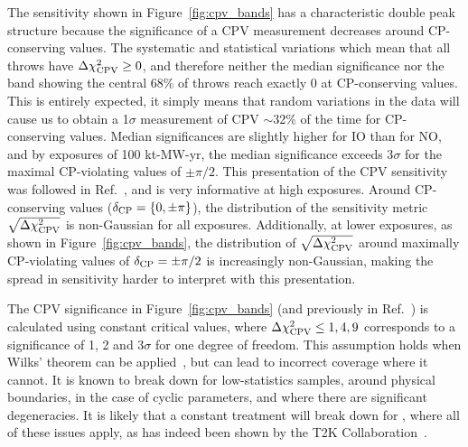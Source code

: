 The sensitivity shown in Figure~\ref{fig:cpv_bands} has a characteristic double peak structure because the significance of a CPV measurement decreases around CP-conserving values. The systematic and statistical variations which mean that all throws have $\Delta\chi^{2}_{\mathrm{CPV}} \geq 0$, and therefore neither the median significance nor the band showing the central 68\% of throws reach exactly 0 at CP-conserving values. This is entirely expected, it simply means that random variations in the data will cause us to obtain a 1$\sigma$ measurement of CPV $\sim$32\% of the time for CP-conserving values. Median significances are slightly higher for IO than for NO, and by exposures of 100 kt-MW-yr, the median significance exceeds 3$\sigma$ for the maximal CP-violating values of $\pm\pi/2$. This presentation of the CPV sensitivity was followed in Ref.~\cite{Abi:2020qib}, and is very informative at high exposures. Around CP-conserving values ($\delta_{\rm CP} = \{0,\pm\pi\}$), the distribution of the sensitivity metric $\sqrt{\Delta\chi^{2}_{\mathrm{CPV}}}$ is non-Gaussian for all exposures. Additionally, at lower exposures, as shown in Figure~\ref{fig:cpv_bands}, the distribution of $\sqrt{\Delta\chi^{2}_{\mathrm{CPV}}}$ around maximally CP-violating values of $\delta_{\rm CP} = \pm\pi/2$ is increasingly non-Gaussian, making the spread in sensitivity harder to interpret with this presentation.

The CPV significance in Figure~\ref{fig:cpv_bands} (and previously in Ref.~\cite{Abi:2020qib}) is calculated using constant \dchisq critical values, where $\Delta\chi^{2}_{\mathrm{CPV}} \leq 1, 4, 9$ corresponds to a significance of 1, 2 and 3$\sigma$ for one degree of freedom. This assumption holds when Wilks' theorem can be applied~\cite{wilks}, but can lead to incorrect coverage where it cannot. It is known to break down for low-statistics samples, around physical boundaries, in the case of cyclic parameters, and where there are significant degeneracies. It is likely that a constant \dchisq treatment will break down for \deltacp, where all of these issues apply, as has indeed been shown by the T2K Collaboration~\cite{Abe:2021gky}.

